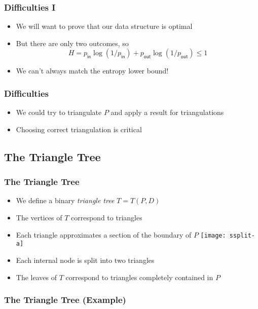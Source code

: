 \documentclass{beamer}
\newcommand{\pin}{p_{\mathsf{in}}}
\newcommand{\pout}{p_{\mathsf{out}}}
\begin{document}
\frame
{
   \frametitle{Difficulties I}
   \begin{itemize}
   \item<1-> We will want to prove that our data structure is optimal
   \item<2-> But there are only two outcomes, so
     \[ H= \pin\log (1/\pin) + \pout\log(1/\pout) \le 1  \]
   \item<3-> We can't always match the entropy lower bound!
   \end{itemize}
}

\frame
{
   \frametitle{Difficulties}
   \begin{itemize}
     \item<1-> We could try to triangulate $P$ and apply a result for 
	triangulations\\
     \item<4-> Choosing correct triangulation is critical
   \end{itemize}
}

\subsection{The Triangle Tree}
\frame
{
   \frametitle{The Triangle Tree}
   \begin{itemize}
    \item<1-> We define a binary \emph{triangle tree} $T=T(P,D)$
    \item<2-> The vertices of $T$ correspond to triangles
    \item<3-> Each triangle approximates a section of the boundary of $P$
    {\texttt{[image: ssplit-a]}}
    \item<4-> Each internal node is split into two triangles
    \item<8-> The leaves of $T$ correspond to triangles completely
	contained in $P$
   \end{itemize}
}

\frame
{
   \frametitle{The Triangle Tree (Example)}
   \\
}
\end{document}
